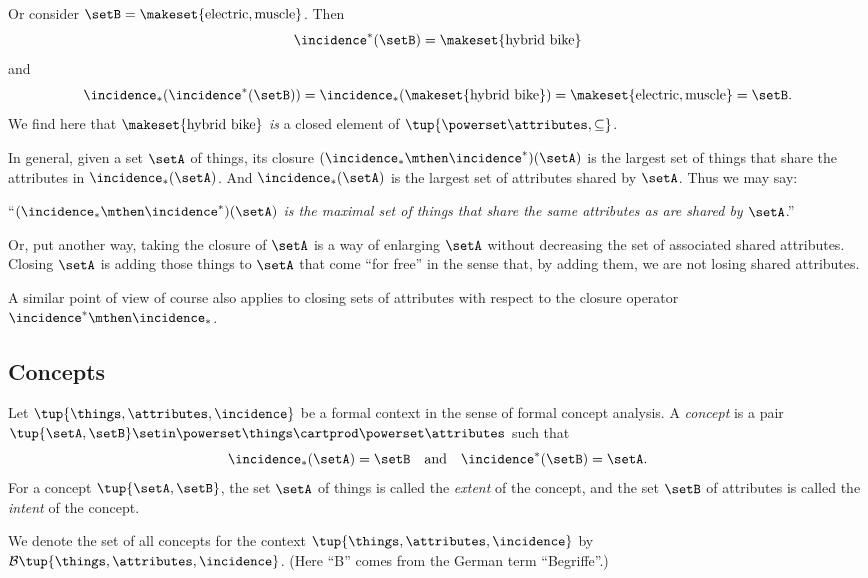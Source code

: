 Or consider $\setB = \makeset{\text{electric}, \text{muscle}}$. Then
\begin{equation}
\incidence^*(\setB) = \makeset{\text{hybrid bike}}
\end{equation}
and 
\begin{equation}
\incidence_*(\incidence^*(\setB)) = \incidence_*(\makeset{\text{hybrid bike}}) = \makeset{\text{electric}, \text{muscle}} = \setB.
\end{equation}
We find here that $\makeset{\text{hybrid bike}}$ \emph{is} a closed element of $\tup{\powerset \attributes, \subseteq}$. 

In general, given a set $\setA$ of things, its closure $(\incidence_* \mthen \incidence^*)(\setA)$ is the largest set of things that share the attributes in $\incidence_*(\setA)$. And $\incidence_*(\setA)$ is the largest set of attributes shared by $\setA$. Thus we may say:

 ``\emph{$(\incidence_* \mthen \incidence^*)(\setA)$ is the maximal set of things that share the same attributes as are shared by $\setA$}.'' 
 
Or, put another way, taking the closure of $\setA$ is a way of enlarging $\setA$ without decreasing the set of associated shared attributes. Closing $\setA$ is adding those things to $\setA$ that come ``for free'' in the sense that, by adding them, we are not losing shared attributes. 

A similar point of view of course also applies to closing sets of attributes with respect to the closure operator $\incidence^* \mthen \incidence_*$.

\subsection{Concepts}

\begin{definition}\label{def:cfa-concept}
Let $\tup{\things, \attributes, \incidence}$ be a formal context in the sense of formal concept analysis. A \emph{concept} is a pair $\tup{\setA, \setB} \setin \powerset\things \cartprod \powerset\attributes$ such that 
\begin{equation}\label{eq:def-concept-equations}
\incidence_*(\setA) = \setB \quad \text{and} \quad \incidence^*(\setB) = \setA.
\end{equation}
For a concept $\tup{\setA, \setB}$, the set $\setA$ of things is called the \emph{extent} of the concept, and the set $\setB$ of attributes is called the \emph{intent} of the concept. 

We denote the set of all concepts for the context $\tup{\things, \attributes, \incidence}$ by $\mathcal{B}\tup{\things, \attributes, \incidence}$. (Here ``B'' comes from the German term ``Begriffe''.) 
\end{definition}

